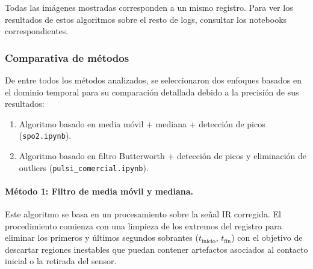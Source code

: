 Todas las imágenes mostradas corresponden a un mismo registro. Para ver los resultados de estos algoritmos sobre el resto de logs, consultar los notebooks correspondientes.

\subsubsection{Comparativa de métodos}

De entre todos los métodos analizados, se seleccionaron dos enfoques basados en el dominio temporal para su comparación detallada debido a la precisión de sus resultados:

\begin{enumerate}
    \item Algoritmo basado en media móvil + mediana + detección de picos (\texttt{spo2.ipynb}).
    \item Algoritmo basado en filtro Butterworth + detección de picos y eliminación de outliers (\texttt{pulsi\_comercial.ipynb}).
\end{enumerate}

\paragraph{Método 1: Filtro de media móvil y mediana.}

Este algoritmo se basa en un procesamiento sobre la señal IR corregida. El procedimiento comienza con una limpieza de los extremos del registro para eliminar los primeros y últimos segundos sobrantes (\(t_{\text{inicio}}\), \(t_{\text{fin}}\)) con el objetivo de descartar regiones inestables que puedan contener artefactos asociados al contacto inicial o la retirada del sensor.

